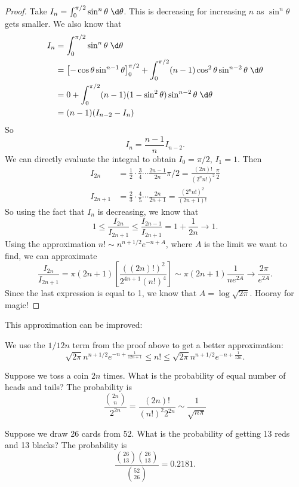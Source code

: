 \documentclass[a4paper]{article}
\begin{document}
\begin{proof}
  Take $I_n = \int_0^{\pi/2} \sin^n\theta\;\d \theta$. This is decreasing for increasing $n$ as $\sin^n\theta$ gets smaller. We also know that
  \begin{align*}
    I_n &= \int_0^{\pi/2}\sin^n \theta\;\d \theta\\
    &= \left[-\cos\theta\sin^{n - 1}\theta \right]_0^{\pi/2} + \int_0^{\pi/2} (n - 1)\cos^2\theta \sin^{n - 2}\theta \;\d\theta\\
    &= 0 + \int_0^{\pi/2}(n - 1)(1 - \sin^2 \theta)\sin^{n - 2}\theta \;\d \theta\\
    &= (n - 1)(I_{n - 2} - I_n)
  \end{align*}
  So
  \[
    I_n = \frac{n - 1}{n}I_{n - 2}.
  \]
  We can directly evaluate the integral to obtain $I_0 = \pi/2$, $I_1 = 1$. Then
  \begin{align*}
    I_{2n} &= \frac{1}{2}\cdot\frac{3}{4}\cdots \frac{2n - 1}{2n} \pi/2 = \frac{(2n)!}{(2^nn!)^2}\frac{\pi}{2}\\
    I_{2n + 1} &= \frac{2}{3}\cdot\frac{4}{5}\cdots\frac{2n}{2n + 1} = \frac{(2^nn!)^2}{(2n + 1)!}
  \end{align*}
  So using the fact that $I_n$ is decreasing, we know that
  \[
    1 \leq \frac{I_{2n}}{I_{2n + 1}} \leq \frac{I_{2n - 1}}{I_{2n + 1}} = 1 + \frac{1}{2n} \to 1.
  \]
  Using the approximation $n!\sim n^{n + 1/2}e^{-n + A}$, where $A$ is the limit we want to find, we can approximate
  \[
    \frac{I_{2n}}{I_{2n + 1}} = \pi(2n + 1)\left[\frac{( (2n)!)^2}{2^{4n + 1}(n!)^4}\right] \sim \pi(2n + 1)\frac{1}{ne^{2A}}\to \frac{2\pi}{e^{2A}}.
  \]
  Since the last expression is equal to 1, we know that $A = \log\sqrt{2\pi}$. Hooray for magic!
\end{proof}

This approximation can be improved:
\begin{prop}
  We use the $1/12n$ term from the proof above to get a better approximation:
  \[
    \sqrt{2\pi}n^{n + 1/2}e^{-n + \frac{1}{12n + 1}} \leq n! \leq \sqrt{2\pi} n^{n + 1/2} e^{-n + \frac{1}{12n}}.
  \]
\end{prop}

\begin{eg}
  Suppose we toss a coin $2n$ times. What is the probability of equal number of heads and tails? The probability is
  \[
    \frac{\binom{2n}{n}}{2^{2n}} = \frac{(2n)!}{(n!)^2 2^{2n}} \sim \frac{1}{\sqrt{n\pi}}
  \]
\end{eg}

\begin{eg}
  Suppose we draw 26 cards from 52. What is the probability of getting 13 reds and 13 blacks? The probability is
  \[
    \frac{\binom{26}{13}\binom{26}{13}}{\binom{52}{26}} = 0.2181.
  \]
\end{eg}
\end{document}
